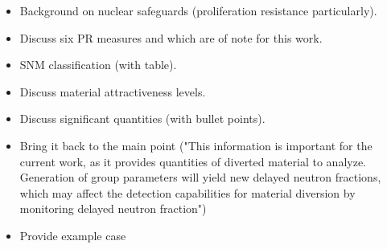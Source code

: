 \begin{itemize}
    \item Background on nuclear safeguards (proliferation resistance particularly).
    \item Discuss six \gls{PR} measures and which are of note for this work.
    \item \gls{SNM} classification (with table).
    \item Discuss material attractiveness levels.
    \item Discuss significant quantities (with bullet points).
    \item Bring it back to the main point ("This information is important for the current work, as it provides quantities of diverted material to analyze. Generation of group parameters will yield new delayed neutron fractions, which may affect the detection capabilities for material diversion by monitoring delayed neutron fraction")
    \item Provide example case
\end{itemize}
